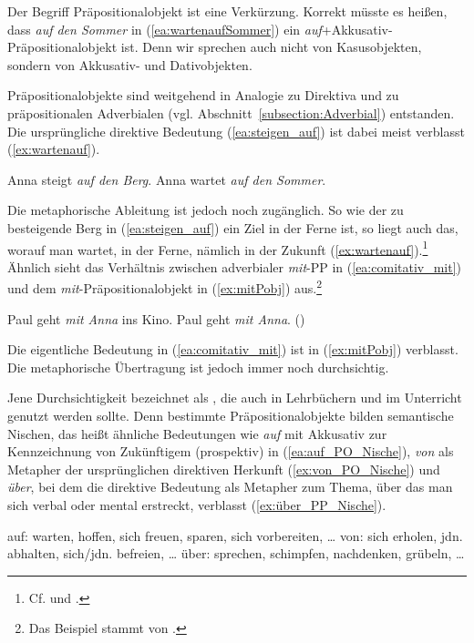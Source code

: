 Der Begriff Präpositionalobjekt ist eine Verkürzung. Korrekt müsste es heißen, dass \textit{auf den Sommer} in (\ref{ea:wartenaufSommer}) ein \textit{auf}+Akkusativ-Präpositionalobjekt ist. Denn wir sprechen auch nicht von Kasusobjekten, sondern von Akkusativ- und Dativobjekten.

Präpositionalobjekte sind weitgehend in Analogie zu Direktiva und zu präpositionalen Adverbialen (vgl. Abschnitt~\ref{subsection:Adverbial}) entstanden. Die ursprüngliche direktive Bedeutung (\ref{ea:steigen_auf}) ist dabei meist verblasst (\ref{ex:wartenauf}). 

\ea \label{ea:Direktiv_Pobj}
\ea \label{ea:steigen_auf} Anna steigt \textit{auf den Berg}.
\ex \label{ex:wartenauf} Anna wartet \textit{auf den Sommer}.
\z 
\z 

Die metaphorische Ableitung ist jedoch noch zugänglich. So wie der zu besteigende Berg in (\ref{ea:steigen_auf}) ein Ziel in der Ferne ist, so liegt auch das, worauf man wartet, in der Ferne, nämlich in der Zukunft (\ref{ex:wartenauf}).\footnote{Cf. \citet[1368]{ZifHoffStr1997} und \citet[12]{Duerscheid1999}.} Ähnlich sieht das Verhältnis zwischen adverbialer \textit{mit}-PP in (\ref{ea:comitativ_mit}) und dem \textit{mit}-Präpositionalobjekt in (\ref{ex:mitPobj}) aus.\footnote{Das Beispiel stammt von \citet[175]{Welke2019}.}

\ea \label{ea:AdverbPP_Pobj}
\ea \label{ea:comitativ_mit} Paul geht \textit{mit Anna} ins Kino.
\ex \label{ex:mitPobj} Paul geht \textit{mit Anna}. ()
\z 
\z 

Die eigentliche Bedeutung  in (\ref{ea:comitativ_mit}) ist in (\ref{ex:mitPobj}) verblasst. Die metaphorische Übertragung ist jedoch immer noch durchsichtig.

Jene Durchsichtigkeit bezeichnet \citet[177]{Welke2019} als , die auch in Lehrbüchern und im Unterricht genutzt werden sollte. Denn bestimmte Präpositionalobjekte bilden semantische Nischen, das heißt ähnliche Bedeutungen wie \textit{auf} mit Akkusativ zur Kennzeichnung von Zukünftigem (prospektiv) in (\ref{ea:auf_PO_Nische}), \textit{von} als Metapher der ursprünglichen direktiven Herkunft (\ref{ex:von_PO_Nische}) und \textit{über}, bei dem die direktive Bedeutung  als Metapher zum Thema, über das man sich verbal oder mental erstreckt, verblasst (\ref{ex:über_PP_Nische}). 

\ea \label{ea:PobNischen}
\ea \label{ea:auf_PO_Nische} auf: warten, hoffen, sich freuen, sparen, sich vorbereiten, \ldots{}
\ex \label{ex:von_PO_Nische} von: sich erholen, jdn. abhalten, sich/jdn. befreien, \ldots{}
\ex \label{ex:über_PP_Nische} über: sprechen, schimpfen, nachdenken, grübeln, \ldots{} 
\z 
\z 
 
